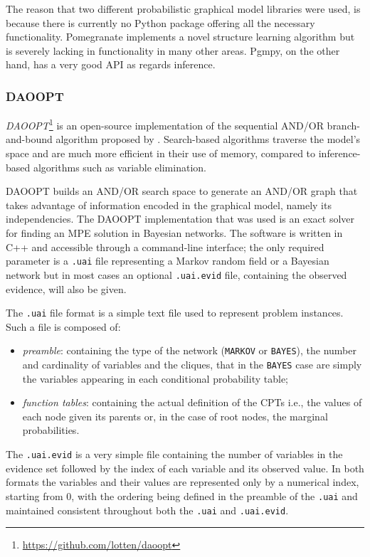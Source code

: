 The reason that two different probabilistic graphical model libraries were used, is because there is currently no Python package offering all the necessary functionality.
Pomegranate implements a novel structure learning algorithm but is severely lacking in functionality in many other areas.
Pgmpy, on the other hand, has a very good API as regards inference.

\subsubsection{DAOOPT}
\textit{DAOOPT}\footnote{\url{https://github.com/lotten/daoopt}} is an open-source implementation of the sequential AND/OR branch-and-bound algorithm proposed by \citet{Marinescu2006}.
Search-based algorithms traverse the model's space and are much more efficient in their use of memory, compared to inference-based algorithms such as variable elimination.

DAOOPT builds an AND/OR search space to generate an AND/OR graph that takes advantage of information encoded in the graphical model, namely its independencies.
The DAOOPT implementation that was used is an exact solver for finding an MPE solution in Bayesian networks.
The software is written in C++ and accessible through a command-line interface; the only required parameter is a \texttt{.uai} file representing a Markov random field or a Bayesian network but in most cases an optional \texttt{.uai.evid} file, containing the observed evidence, will also be given.

The \texttt{.uai} file format is a simple text file used to represent problem instances.
Such a file is composed of:
\begin{itemize}
  \item \textit{preamble}: containing the type of the network (\texttt{MARKOV} or \texttt{BAYES}), the number and cardinality of variables and the cliques, that in the \texttt{BAYES} case are simply the variables appearing in each conditional probability table;
  \item \textit{function tables}: containing the actual definition of the CPTs i.e., the values of each node given its parents or, in the case of root nodes, the marginal probabilities.
\end{itemize}

The \texttt{.uai.evid} is a very simple file containing the number of variables in the evidence set followed by the index of each variable and its observed value.
In both formats the variables and their values are represented only by a numerical index, starting from $0$, with the ordering being defined in the preamble of the \texttt{.uai} and maintained consistent throughout both the \texttt{.uai} and \texttt{.uai.evid}.

